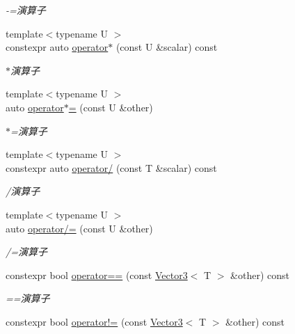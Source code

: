 \begin{DoxyCompactItemize}
\begin{DoxyCompactList}\small\item\em -\/=演算子 \end{DoxyCompactList}\item 
{\footnotesize template$<$typename U $>$ }\\constexpr auto \mbox{\hyperlink{classsaki_1_1_vector3_a5136a5b7f840d84ecce85a760d17bf6f}{operator$\ast$}} (const U \&scalar) const
\begin{DoxyCompactList}\small\item\em $\ast$演算子 \end{DoxyCompactList}\item 
{\footnotesize template$<$typename U $>$ }\\auto \mbox{\hyperlink{classsaki_1_1_vector3_a207b4651058144d0f57deee0fbd3387a}{operator$\ast$=}} (const U \&other)
\begin{DoxyCompactList}\small\item\em $\ast$=演算子 \end{DoxyCompactList}\item 
{\footnotesize template$<$typename U $>$ }\\constexpr auto \mbox{\hyperlink{classsaki_1_1_vector3_a217f6ed4a5ea25f40983574077f8e71d}{operator/}} (const T \&scalar) const
\begin{DoxyCompactList}\small\item\em /演算子 \end{DoxyCompactList}\item 
{\footnotesize template$<$typename U $>$ }\\auto \mbox{\hyperlink{classsaki_1_1_vector3_a948031e81e8a2223a2814c35dd7429b6}{operator/=}} (const U \&other)
\begin{DoxyCompactList}\small\item\em /=演算子 \end{DoxyCompactList}\item 
constexpr bool \mbox{\hyperlink{classsaki_1_1_vector3_ad03a150d0fa01d9a673081cb0ceb150e}{operator==}} (const \mbox{\hyperlink{classsaki_1_1_vector3}{Vector3}}$<$ T $>$ \&other) const
\begin{DoxyCompactList}\small\item\em ==演算子 \end{DoxyCompactList}\item 
constexpr bool \mbox{\hyperlink{classsaki_1_1_vector3_aaaf161e4fc7f76aeee0d074efd411748}{operator!=}} (const \mbox{\hyperlink{classsaki_1_1_vector3}{Vector3}}$<$ T $>$ \&other) const

\end{DoxyCompactItemize}
